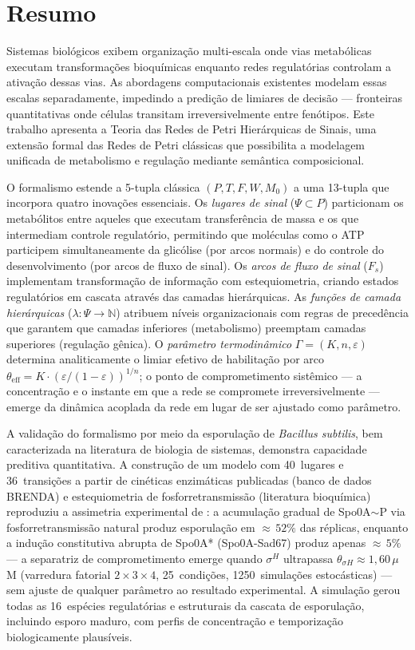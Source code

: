 \chapter*{Resumo}

Sistemas biológicos exibem organização multi-escala onde vias metabólicas
executam transformações bioquímicas enquanto redes regulatórias controlam a
ativação dessas vias. As abordagens computacionais existentes modelam essas
escalas separadamente, impedindo a predição de limiares de decisão ---
fronteiras quantitativas onde células transitam irreversivelmente entre
fenótipos. Este trabalho apresenta a Teoria das Redes de Petri Hierárquicas de
Sinais, uma extensão formal das Redes de Petri clássicas que possibilita
a modelagem unificada de metabolismo e regulação mediante semântica
composicional.

O formalismo estende a 5-tupla clássica $(P, T, F, W, M_0)$ a uma 13-tupla
que incorpora quatro inovações essenciais.
Os \emph{lugares de sinal} ($\Psi \subset P$) particionam os metabólitos entre
aqueles que executam transferência de massa e os que intermediam controle
regulatório, permitindo que moléculas como o ATP participem simultaneamente da
glicólise (por arcos normais) e do controle do desenvolvimento (por arcos de
fluxo de sinal).
Os \emph{arcos de fluxo de sinal} ($F_s$) implementam transformação de
informação com estequiometria, criando estados regulatórios em cascata através
das camadas hierárquicas.
As \emph{funções de camada hierárquicas}
($\lambda: \Psi \to \mathbb{N}$) atribuem níveis organizacionais com regras de
precedência que garantem que camadas inferiores (metabolismo) preemptam camadas
superiores (regulação gênica).
O \emph{parâmetro termodinâmico} $\Gamma = (K, n, \varepsilon)$ determina
analiticamente o limiar efetivo de habilitação por arco
$\theta_{\text{eff}} = K \cdot (\varepsilon / (1 - \varepsilon))^{1/n}$;
o ponto de comprometimento sistêmico --- a concentração e o instante em que a
rede se compromete irreversivelmente --- emerge da dinâmica acoplada da rede
em lugar de ser ajustado como parâmetro.

A validação do formalismo por meio da esporulação de \emph{Bacillus subtilis},
bem caracterizada na literatura de biologia de sistemas, demonstra capacidade
preditiva quantitativa. A construção de um modelo com 40~lugares e
36~transições a partir de cinéticas enzimáticas publicadas (banco de dados BRENDA)
e estequiometria de fosforretransmissão (literatura bioquímica) reproduziu a
assimetria experimental de \textcite{Fujita2005}: a acumulação gradual de
Spo0A${\sim}$P via fosforretransmissão natural produz esporulação em
${\approx}\,52\%$ das réplicas, enquanto a indução constitutiva abrupta de
Spo0A* (Spo0A-Sad67) produz apenas ${\approx}\,5\%$ --- a separatriz de
comprometimento emerge quando $\sigma^H$ ultrapassa $\theta_{\sigma H}
\approx 1{,}60\,\mu$M (varredura fatorial $2 \times 3 \times 4$, 25~condições,
1250~simulações estocásticas) --- sem ajuste de qualquer parâmetro ao
resultado experimental.
A simulação gerou todas as 16~espécies regulatórias e estruturais da cascata
de esporulação, incluindo esporo maduro, com perfis de concentração e
temporização biologicamente plausíveis.

